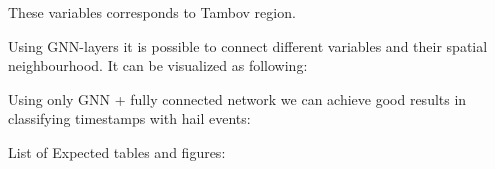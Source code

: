 \documentclass{article}
\begin{document}
These variables corresponds to Tambov region.

Using GNN-layers it is possible to connect different variables and their spatial neighbourhood. It can be visualized as following: 

\begin{figure}[h]
\end{figure}

Using only GNN + fully connected network we can achieve good results in classifying timestamps with hail events:
\begin{figure}[h]
\end{figure}

\newpage
List of Expected tables and figures:
\end{document}
